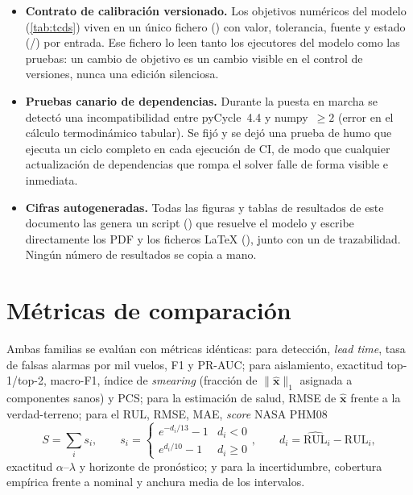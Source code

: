 \begin{itemize}
  \item \textbf{Contrato de calibración versionado.} Los objetivos numéricos del modelo
    (\cref{tab:tcds}) viven en un único fichero
    () con valor, tolerancia, fuente y estado
    (/) por entrada. Ese fichero lo leen tanto los
    ejecutores del modelo como las pruebas: un cambio de objetivo es un cambio visible en el
    control de versiones, nunca una edición silenciosa.
  \item \textbf{Pruebas canario de dependencias.} Durante la puesta en marcha se detectó una
    incompatibilidad entre pyCycle~4.4 y numpy~$\geq 2$ (error en el cálculo termodinámico
    tabular). Se fijó  y se dejó una prueba de humo que ejecuta un ciclo
    completo en cada ejecución de CI, de modo que cualquier actualización de dependencias que
    rompa el solver falle de forma visible e inmediata.
  \item \textbf{Cifras autogeneradas.} Todas las figuras y tablas de resultados de este
    documento las genera un script () que resuelve el
    modelo y escribe directamente los PDF y los ficheros \LaTeX{}
    (), junto con un  de
    trazabilidad. Ningún número de resultados se copia a mano.
\end{itemize}

\section{Métricas de comparación}

Ambas familias se evalúan con métricas idénticas: para detección, \emph{lead time}, tasa de
falsas alarmas por mil vuelos, F1 y PR-AUC; para aislamiento, exactitud top-1/top-2, macro-F1,
índice de \emph{smearing} (fracción de $\|\hat{\mathbf{x}}\|_1$ asignada a componentes sanos) y
PCS; para la estimación de salud, RMSE de $\hat{\mathbf{x}}$ frente a la verdad-terreno; para el
RUL, RMSE, MAE, \emph{score} NASA PHM08
\begin{equation}
  S=\sum_i s_i,\qquad
  s_i = \begin{cases} e^{-d_i/13}-1 & d_i<0\\ e^{d_i/10}-1 & d_i\geq 0\end{cases},
  \qquad d_i = \widehat{\mathrm{RUL}}_i - \mathrm{RUL}_i,
\end{equation}
exactitud $\alpha$--$\lambda$ y horizonte de pronóstico; y para la incertidumbre, cobertura
empírica frente a nominal y anchura media de los intervalos.
